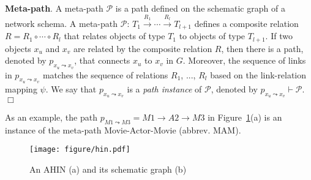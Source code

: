 
\begin{definition}
\textbf{Meta-path}. A meta-path $\mathcal{P}$ is a path defined on the 
schematic graph of a network schema.
A meta-path $\mathcal{P}$: $T_1\stackrel{R_1}{\longrightarrow} \cdots\stackrel{R_l}{\longrightarrow} T_{l+1}$
 defines a composite relation $R = R_1\circ \cdots \circ R_l$ 
 that relates objects of type $T_1$ to objects of type $T_{l+1}$.
 If two objects $x_u$ and $x_v$ are related by the composite relation $R$,
 then there is a path, denoted by $p_{x_u\leadsto{x_v}}$, that connects $x_u$ to $x_v$ in $G$.
 Moreover, the sequence of links in $p_{x_u\leadsto{x_v}}$ matches the sequence of relations
 $R_1$, ..., $R_l$ based on the link-relation mapping $\psi$.
 We say that $p_{x_u\leadsto{x_v}}$ is a {\it path instance} of $\mathcal{P}$, denoted by
 $p_{x_u\leadsto{x_v}} \vdash \mathcal{P}$.
 \hfill$\Box$
\end{definition}

As an example, the path $p_{M1 \leadsto M3} = M1\rightarrow A2 \rightarrow M3$
in Figure~\ref{figure:subnetworks}(a)
is an instance of  the meta-path Movie-Actor-Movie (abbrev. MAM). 
%
%

\begin{figure}
    \centering
    \vspace{-3mm}
        \texttt{[image: figure/hin.pdf]}
        \caption{{\scriptsize An AHIN (a) and its schematic graph (b)}}
        \label{figure:subnetworks}
        \vspace{-2mm}
\end{figure}

